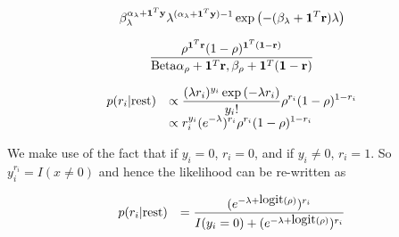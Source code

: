 \documentclass{amsart}[12pt]
\begin{document}
%
%
%


$$
\beta_{\lambda}^{\alpha_\lambda+{\bf 1}^T{\bf y}} \lambda^{(\alpha_\lambda + {\bf 1}^T{\bf y}) - 1} \exp{\left(-(\beta_\lambda + {\bf1}^T{\bf r}) \lambda \right)}
$$

$$
\frac{\rho^{{\bf 1}^T{\bf r}} (1 - \rho)^{{\bf 1}^T({\bf 1} - {\bf r})}}{\text{Beta}{\alpha_\rho + {\bf1}^T {\bf r}, \beta_\rho + {\bf1}^T({\bf1}- {\bf r})}}
$$

$$
\begin{array}{ll}
	p(r_i | \text{rest}) & \displaystyle \propto \frac{(\lambda r_i)^{y_i} \exp{(-\lambda r_i)}}{y_i !} \rho^{r_i} (1 - \rho)^{1 - r_i} \\
	                     & \displaystyle \propto r_i^{y_i} (e^{-\lambda})^{r_i} \rho^{r_i} (1 - \rho)^{1 - r_i}                         
\end{array}
$$

We make use of the fact that if $y_i = 0$, $r_i = 0$, and if $y_i \ne 0$,
$r_i = 1$. So $y_i^{r_i} = I(x \ne 0)$ and hence the likelihood can be re-written as

$$
\begin{array}{ll}
	p(r_i | \text{rest}) & \displaystyle = \frac{(e^{-\lambda + \mbox{logit}{(\rho)}})^{r_i}}{I(y_i = 0) + (e^{-\lambda + \mbox{logit}{(\rho)}})^{r_i}} 
\end{array}
$$
\end{document}
